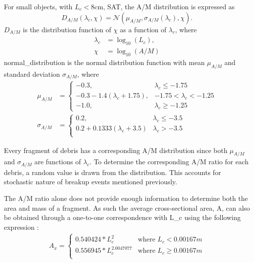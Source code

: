 \documentclass[a4paper, 12pt]{article}
\begin{document}
For small objects, with $L_c < 8$cm, SAT, the A/M distribution is expressed as
\begin{equation}
	D_{A/M}(\lambda_c, \chi) = \mathcal{N}(\mu_{A/M}, \sigma_{A/M}(\lambda_c), \chi).
\end{equation}
$D_{A/M}$ is the distribution function of $\chi$ as a function of $\lambda_c$, where
\begin{align}
	\lambda_c &= \log_{10}(L_c),\\
	\chi &= \log_{10}(A/M)
\end{align}
\Gls{normal_distribution} is the normal distribution function with mean $\mu_{A/M}$ and standard deviation $\sigma_{A/M}$, where
\begin{align}
	 \mu_{A/M} &= \begin{cases} 
		-0.3, & \lambda_c\leq -1.75 \\
		-0.3 - 1.4(\lambda_c + 1.75), & -1.75 < \lambda_c <-1.25 \\
		-1.0, & \lambda_c \geq -1.25 
	\end{cases}\\
	\sigma_{A/M} &= \begin{cases} 
		0.2, & \lambda_c \leq -3.5 \\
		0.2 + 0.1333(\lambda_c + 3.5) & \lambda_c > -3.5 \\
	\end{cases}
\end{align}

Every fragment of debris has a corresponding A/M distribution since both $\mu_{A/M}$ and $\sigma_{A/M}$ are functions of $\lambda_c$. To determine the corresponding A/M ratio for each debris, a random value is drawn from the distribution. This accounts for stochastic nature of breakup events mentioned previously. 

The A/M ratio alone does not provide enough information to determine both the area and mass of a fragment. As such the average cross-sectional area, A, can also be obtained through a one-to-one correspondence with \Gls{L_c} using the following expression \citep{johnson_nasas_2001}:
\begin{align}
	A_x = \begin{cases}
		0.540424 * L_c^2 & \text{where } L_c < 0.00167 m \\
		0.556945 * L_c^{2.0047077} & \text{where } L_c \geq 0.00167 m \\
	\end{cases}
\end{align}
\end{document}
